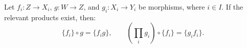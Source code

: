 Let $f_i : Z \to X_i$, $g : W \to Z$, and $g_i : X_i \to Y_i$ be morphisms, where $i \in I$. If the relevant products exist, then:
$$
\{f_i\} \circ g = \{f_i g\}, \qquad \left( \prod_i g_i \right) \circ \{f_i\} = \{g_i f_i\}.
$$
